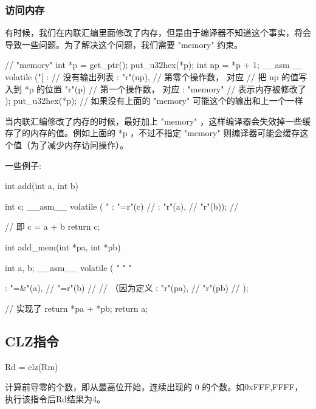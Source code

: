 \subsubsection{访问内存}
有时候，我们在内联汇编里面修改了内存，但是由于编译器不知道这个事实，将会导致一些问题。为了解决这个问题，我们需要 "memory" 约束。
\begin{myccode}
// "memory"
int *p = get_ptr();
put_u32hex(*p);
int np = *p + 1;
__asm__ volatile ("[%
: // 没有输出列表
: "r"(np), // 第零个操作数， 对应 %
// 把 np 的值写入到 *p 的位置
"r"(p) // 第一个操作数， 对应 %
 : "memory" // 表示内存被修改了
 );
 put_u32hex(*p); // 如果没有上面的 "memory" 可能这个的输出和上一个一样
\end{myccode}

当内联汇编修改了内存的时候，最好加上 "memory" ，这样编译器会失效掉一些缓存了的内存的值。例如上面的 *p ，不过不指定 "memory" 则编译器可能会缓存这个值（为了减少内存访问操作）。

一些例子:
\begin{myccode}
int add(int a, int b)
{
    int c;
    __asm__ volatile (
    "%
    : "=r"(c) // %
    : "r"(a), // %
    "r"(b)); // %

     // 即 c = a + b
     return c;
}

int add_mem(int *pa, int *pb)
{
    int a, b;
    __asm__ volatile (
    "%
    "%
    "%

    :
    "=&"(a), // %
    "=r"(b) // %
    // （因为定义 %
    : "r"(pa), // %
    "r"(pb) // %
);

// 实现了 return *pa + *pb;
return a;
}
\end{myccode}

\subsection{CLZ指令}
\begin{myccode}
    Rd = clz(Rm)
\end{myccode}
计算前导零的个数，即从最高位开始，连续出现的 0 的个数。如0xFFF,FFFF，执行该指令后Rd结果为4。

